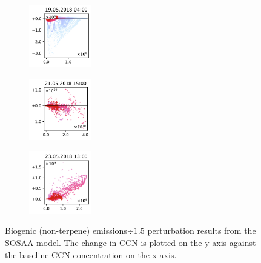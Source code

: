 \begin{figure}[H]
    \begin{subfigure}
        \centering
        \includegraphics[width=0.30\textwidth,valign=t]{evaluation/figures/perturbations/perturbation-19.05.2018:04.00-biogenic-div-1.5.pdf}
    \end{subfigure}
    \begin{subfigure}
        \centering
        \includegraphics[width=0.30\textwidth,valign=t]{evaluation/figures/perturbations/perturbation-21.05.2018:15.00-biogenic-div-1.5.pdf}
    \end{subfigure}
    \begin{subfigure}
        \centering
        \includegraphics[width=0.30\textwidth,valign=t]{evaluation/figures/perturbations/perturbation-23.05.2018:13.00-biogenic-div-1.5.pdf}
    \end{subfigure}

    \caption[Biogenic emissions$\div 1.5$ perturbation SOSAA results]{Biogenic (non-terpene) emissions$\div 1.5$ perturbation results from the SOSAA model. The change in CCN is plotted on the y-axis against the baseline CCN concentration on the x-axis.}
    \label{fig:sosaa-perturbation-biogenic-div-1.5}
\end{figure}

